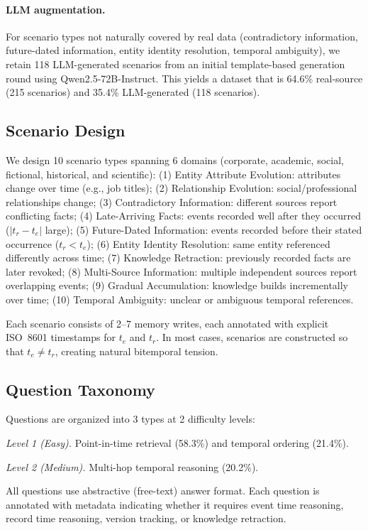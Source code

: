 \paragraph{LLM augmentation.}
For scenario types not naturally covered by real data (contradictory information, future-dated information, entity identity resolution, temporal ambiguity), we retain 118 LLM-generated scenarios from an initial template-based generation round using Qwen2.5-72B-Instruct.
This yields a dataset that is 64.6\% real-source (215 scenarios) and 35.4\% LLM-generated (118 scenarios).

\subsection{Scenario Design}
We design 10 scenario types spanning 6 domains (corporate, academic, social, fictional, historical, and scientific):
(1) Entity Attribute Evolution: attributes change over time (e.g., job titles);
(2) Relationship Evolution: social/professional relationships change;
(3) Contradictory Information: different sources report conflicting facts;
(4) Late-Arriving Facts: events recorded well after they occurred ($|t_r - t_e|$ large);
(5) Future-Dated Information: events recorded before their stated occurrence ($t_r < t_e$);
(6) Entity Identity Resolution: same entity referenced differently across time;
(7) Knowledge Retraction: previously recorded facts are later revoked;
(8) Multi-Source Information: multiple independent sources report overlapping events;
(9) Gradual Accumulation: knowledge builds incrementally over time;
(10) Temporal Ambiguity: unclear or ambiguous temporal references.

Each scenario consists of 2--7 memory writes, each annotated with explicit ISO~8601 timestamps for $t_e$ and $t_r$. In most cases, scenarios are constructed so that $t_e \neq t_r$, creating natural bitemporal tension.

\subsection{Question Taxonomy}
Questions are organized into 3 types at 2 difficulty levels:

\textit{Level 1 (Easy).} Point-in-time retrieval (58.3\%) and temporal ordering (21.4\%).

\textit{Level 2 (Medium).} Multi-hop temporal reasoning (20.2\%).

All questions use abstractive (free-text) answer format. Each question is annotated with metadata indicating whether it requires event time reasoning, record time reasoning, version tracking, or knowledge retraction.

